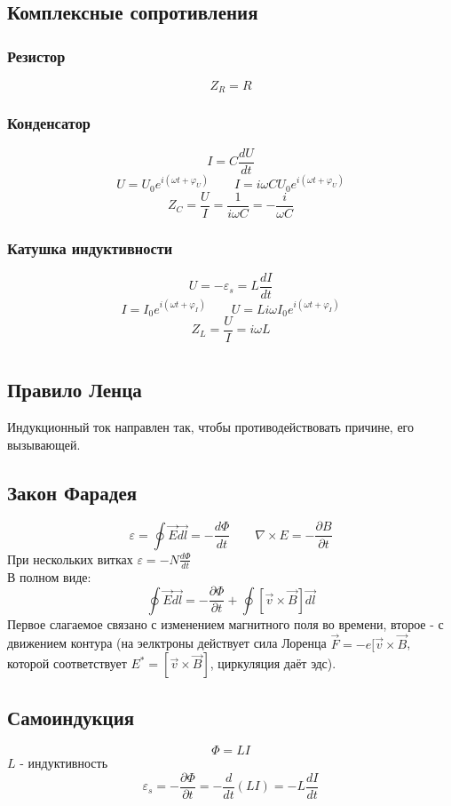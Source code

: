 \documentclass{article}
\begin{document}
\subsection{Комплексные сопротивления}
\subsubsection{Резистор}
\[Z_R=R\]
\subsubsection{Конденсатор}
\[I=C\frac{dU}{dt}\]
\[U=U_0e^{i(\omega t + \varphi_U)} \qquad I=i\omega CU_0e^{i(\omega t + \varphi_U)}\]
\[Z_C=\frac{U}{I}=\frac{1}{i\omega C}=-\frac{i}{\omega C}\]
\subsubsection{Катушка индуктивности}
\[U=-\varepsilon_s=L\frac{dI}{dt}\]
\[I=I_0e^{i(\omega t + \varphi_I)} \qquad U=Li\omega I_0e^{i(\omega t + \varphi_I)}\]
\[Z_L=\frac{U}{I}=i\omega L\]


\section{}
\subsection{Правило Ленца}
Индукционный ток направлен так, чтобы противодействовать причине, его вызывающей.
\subsection{Закон Фарадея}
\[\varepsilon=\oint\vec{E}\vec{dl}=-\frac{d\Phi}{dt} \qquad \nabla\times E=-\frac{\partial B}{\partial t}\]
При нескольких витках $\varepsilon=-N\frac{d\Phi}{dt}$ \\
В полном виде:
\[\oint\vec{E}\vec{dl}=-\frac{\partial\Phi}{\partial t}+\oint[\vec{v}\times\vec{B}]\vec{dl}\]
Первое слагаемое связано с изменением магнитного поля во времени, второе - с движением контура (на эелктроны действует сила Лоренца $\vec{F}=-e[\vec{v}\times\vec{B}$, которой соответствует $E^*=[\vec{v}\times\vec{B}]$, циркуляция даёт эдс).
\subsection{Самоиндукция}
\[\Phi=LI\]
$L$ - индуктивность
\[\varepsilon_{s}=-\frac{\partial\Phi}{\partial t}=-\frac{d}{dt}(LI)=-L\frac{dI}{dt}\]
\end{document}
